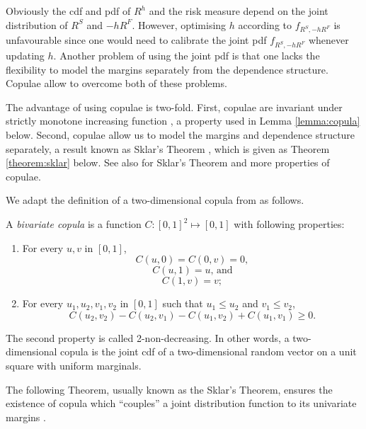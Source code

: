 Obviously the cdf and pdf of $R^h$ and the risk measure depend on the
joint distribution of $R^S$ and $-hR^F$. However, optimising $h$
according to $f_{R^S,-hR^F}$ is unfavourable since one would need to
calibrate the joint pdf $f_{R^S,-hR^F}$ whenever updating $h$.
Another problem of using the joint pdf is that one lacks the
flexibility to model the margins separately from the dependence
structure. Copulae allow to overcome both of these problems. 

The advantage of using copulae is two-fold.
First, copulae are invariant under strictly
monotone increasing function \citep{schweizer1981nonparametric}, a
property used in Lemma \ref{lemma:copula} below. 
Second, copulae allow us to model the margins and dependence structure 
separately, a result known as Sklar's Theorem \citep{Sklar1959}, which
is given as Theorem \ref{theorem:sklar} below. 
See also \citep{Nelsen1999, joe1997multivariate, McNeil2005} for
Sklar's Theorem and more properties of copulae.

We adapt the definition of a two-dimensional copula from
\citep{Nelsen1999} as follows.

\begin{defi} 
  A {\em bivariate copula} is a function $C: [0,1]^2 \mapsto [0,1]$ with following properties:
  \begin{enumerate}
    \item For every $u,v$ in $[0,1]$,
      \[C(u,0)= C(0,v)=0, \]
    \[C(u,1)= u \text{, and}\]
    \[C(1,v)= v;\]
    \item For every $u_1,u_2, v_1, v_2$ in $[0,1]$ such that $u_1 \leq u_2$ and $v_1 \leq v_2$,
    \[C(u_2,v_2)-C(u_2,v_1)-C(u_1, v_2)+C(u_1,v_1) \geq 0.\]
  \end{enumerate}
  \end{defi}

The second property is called 2-non-decreasing.
In other words, a two-dimensional copula is the joint cdf of a two-dimensional random vector
on a unit square with uniform marginals.

The following Theorem, usually known as the Sklar's
Theorem, ensures the existence of copula which “couples” a 
joint distribution function to its univariate margins \citep[Theorem 2.3.3.]{Nelsen1999}.


